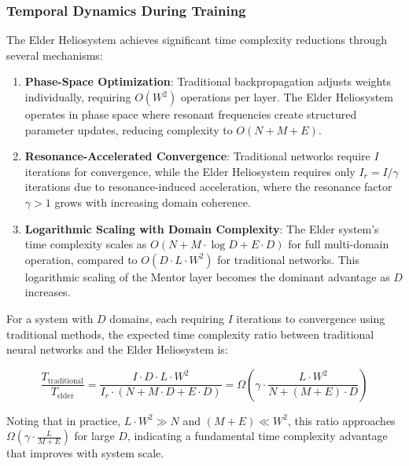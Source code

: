\subsubsection{Temporal Dynamics During Training}

The Elder Heliosystem achieves significant time complexity reductions through several mechanisms:

\begin{enumerate}
    \item \textbf{Phase-Space Optimization}: Traditional backpropagation adjusts weights individually, requiring $O(W^2)$ operations per layer. The Elder Heliosystem operates in phase space where resonant frequencies create structured parameter updates, reducing complexity to $O(N + M + E)$.
    
    \item \textbf{Resonance-Accelerated Convergence}: Traditional networks require $I$ iterations for convergence, while the Elder Heliosystem requires only $I_r = I/\gamma$ iterations due to resonance-induced acceleration, where the resonance factor $\gamma > 1$ grows with increasing domain coherence.
    
    \item \textbf{Logarithmic Scaling with Domain Complexity}: The Elder system's time complexity scales as $O(N + M \cdot \log D + E \cdot D)$ for full multi-domain operation, compared to $O(D \cdot L \cdot W^2)$ for traditional networks. This logarithmic scaling of the Mentor layer becomes the dominant advantage as $D$ increases.
\end{enumerate}

\begin{proposition}
For a system with $D$ domains, each requiring $I$ iterations to convergence using traditional methods, the expected time complexity ratio between traditional neural networks and the Elder Heliosystem is:

\begin{equation}
\frac{T_{\text{traditional}}}{T_{\text{elder}}} = \frac{I \cdot D \cdot L \cdot W^2}{I_r \cdot (N + M \cdot D + E \cdot D)} = \Omega(\gamma \cdot \frac{L \cdot W^2}{N + (M+E) \cdot D})
\end{equation}

Noting that in practice, $L \cdot W^2 \gg N$ and $(M+E) \ll W^2$, this ratio approaches $\Omega(\gamma \cdot \frac{L}{M+E})$ for large $D$, indicating a fundamental time complexity advantage that improves with system scale.
\end{proposition}

